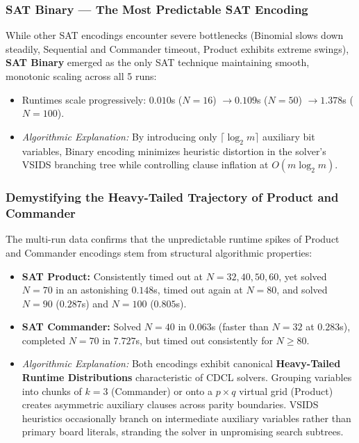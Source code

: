 \documentclass[a4paper,11pt]{article}
\begin{document}
\subsubsection{SAT Binary — The Most Predictable SAT Encoding}
While other SAT encodings encounter severe bottlenecks (Binomial slows down steadily, Sequential and Commander timeout, Product exhibits extreme swings), \textbf{SAT Binary} emerged as the only SAT technique maintaining smooth, monotonic scaling across all 5 runs:
\begin{itemize}
    \item Runtimes scale progressively: $0.010$s ($N=16$) $\to 0.109$s ($N=50$) $\to 1.378$s ($N=100$).
    \item \textit{Algorithmic Explanation:} By introducing only $\lceil \log_2 m \rceil$ auxiliary bit variables, Binary encoding minimizes heuristic distortion in the solver's VSIDS branching tree while controlling clause inflation at $O(m \log_2 m)$.
\end{itemize}

\subsubsection{Demystifying the Heavy-Tailed Trajectory of Product and Commander}
The multi-run data confirms that the unpredictable runtime spikes of Product and Commander encodings stem from structural algorithmic properties:
\begin{itemize}
    \item \textbf{SAT Product:} Consistently timed out at $N = 32, 40, 50, 60$, yet solved $N = 70$ in an astonishing $0.148$s, timed out again at $N = 80$, and solved $N = 90$ ($0.287$s) and $N = 100$ ($0.805$s).
    \item \textbf{SAT Commander:} Solved $N = 40$ in $0.063$s (faster than $N = 32$ at $0.283$s), completed $N = 70$ in $7.727$s, but timed out consistently for $N \ge 80$.
    \item \textit{Algorithmic Explanation:} Both encodings exhibit canonical \textbf{Heavy-Tailed Runtime Distributions} characteristic of CDCL solvers. Grouping variables into chunks of $k=3$ (Commander) or onto a $p \times q$ virtual grid (Product) creates asymmetric auxiliary clauses across parity boundaries. VSIDS heuristics occasionally branch on intermediate auxiliary variables rather than primary board literals, stranding the solver in unpromising search subtrees.
\end{itemize}
\end{document}
